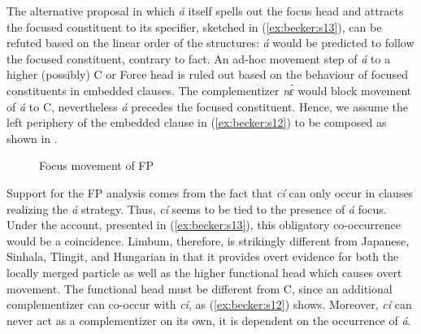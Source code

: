 \documentclass[output=paper,
modfonts
]{langscibook}
\begin{document}
The alternative proposal in which {\em \'a} itself spells out the focus head and attracts the focused constituent to its specifier, sketched in (\ref{ex:becker:s13}), can be refuted based on the linear order of the structures: {\em \'a} would be predicted to follow the focused constituent, contrary to fact. An ad-hoc movement step of {\em \'a} to a higher (possibly) C or Force head is ruled out based on the behaviour of focused constituents in embedded clauses.
\ea
{}
\z \z
\noindent The complementizer {\em n\`ɛ} would block movement of {\em \'a} to C, nevertheless {\em \'a} precedes the focused constituent. Hence, we assume the left periphery of the embedded clause in (\ref{ex:becker:s12}) to be composed as shown in .
\begin{figure}
\caption{Focus movement of FP}
\label{fig:syntax:f1}
\end{figure}

Support for the FP analysis comes from the fact that {\em c\'i} can only occur in clauses realizing the {\em \'a} strategy. Thus, {\em c\'i} seems to be tied to the presence of {\em \'a} focus. Under the account, presented in (\ref{ex:becker:s13}), this obligatory co-occurrence would be a coincidence. Limbum, therefore, is strikingly different from Japanese, Sinhala, Tlingit, and Hungarian in that it provides overt evidence for both the locally merged particle as well as the higher functional head which causes overt movement. The functional head must be different from C, since an additional complementizer can co-occur with {\em c\'i}, as (\ref{ex:becker:s12}) shows. Moreover, {\em c\'i} can never act as a complementizer on its own, it is dependent on the occurrence of {\em \'a}.
\end{document}
